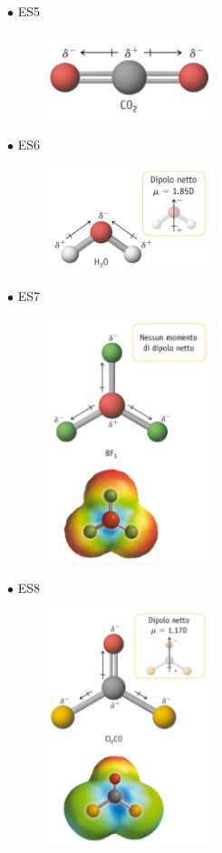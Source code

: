 $\bullet$ ES5

\begin{figure}[htp]
    \centering
    \includegraphics[width=5cm]{immagini/CO_2.png}
\end{figure}

$\bullet$ ES6

\begin{figure}[htp]
    \centering
    \includegraphics[width=5cm]{immagini/H_2O.png}
\end{figure}

$\bullet$ ES7

\begin{figure}[htp]
    \centering
    \includegraphics[width=5cm]{immagini/BF_3-dipolo.png}
\end{figure}

$\bullet$ ES8

\begin{figure}[htp]
    \centering
    \includegraphics[width=5cm]{immagini/Cl_2CO.png}
\end{figure}

